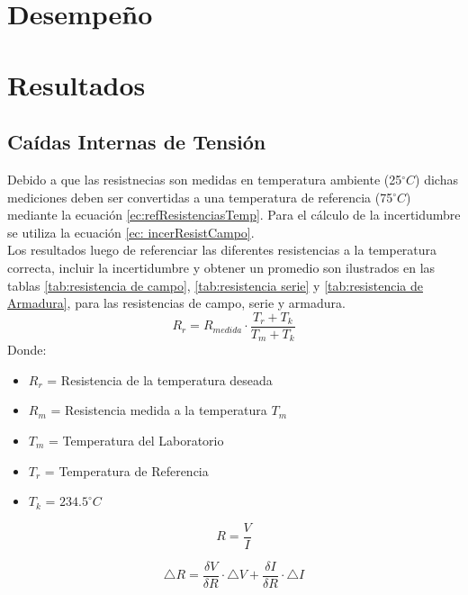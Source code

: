 \documentclass[11pt,letterpaper]{article}
\begin{document}
\section{Desempeño}
\section{Resultados}
\subsection{Caídas Internas de Tensión}
	Debido a que las resistnecias son medidas en temperatura ambiente (25$^{\circ}C$) dichas mediciones deben ser convertidas a una temperatura de referencia (75$^{\circ}C$) mediante la ecuación \ref{ec:refResistenciasTemp}.
	Para el cálculo de la incertidumbre se utiliza la ecuación \ref{ec: incerResistCampo}.\\
	
	Los resultados luego de referenciar las diferentes resistencias a la temperatura correcta, incluir la incertidumbre y obtener un promedio son ilustrados en las tablas \ref{tab:resistencia de campo}, \ref{tab:resistencia serie} y \ref{tab:resistencia de Armadura}, para las resistencias de campo, serie y armadura.\\
\begin{equation}\label{ec:refResistenciasTemp}
	R_{r} = R_{medida} \cdot \frac{T_{r}+T_{k}}{T_{m}+T_{k}}
\end{equation}
Donde:
\begin{itemize}
	\item $R_{r}$ = Resistencia de la temperatura deseada
	\item $R_{m}$ = Resistencia medida a la temperatura $T_{m}$
	\item $T_{m}$ = Temperatura del Laboratorio
	\item $T_{r}$ = Temperatura de Referencia
	\item $T_{k}$ = $234.5 ^{\circ} C$ 
\end{itemize}

\begin{equation}\label{ec:ohm}
	R = \frac{V}{I}
\end{equation}

\begin{equation}\label{ec: incerResistCampo}
	\bigtriangleup R = \frac{\delta V}{\delta R} \cdot \bigtriangleup V + \frac{\delta I}{\delta R} \cdot \bigtriangleup I
\end{equation}
\end{document}
